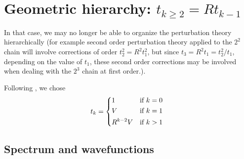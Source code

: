 \documentclass[11pt]{article}
\begin{document}
\section{Geometric hierarchy: $t_{k\geq2} = R t_{k-1}$}
In that case, we may no longer be able to organize the perturbation theory hierarchically (for example second order perturbation theory applied to the $2^2$ chain will involve corrections of order $t_2^2 = R^2 t_1^2$, but since $t_3 = R^2 t_1 = t_2^2/t_1$, depending on the value of $t_1$, these second order corrections may be involved when dealing with the $2^{3}$ chain at first order.).

Following \cite{transitionmatrix}, we chose
\begin{equation}
t_k = \begin{dcases*}
        1  & if $k=0$ \\
        V & if $k=1$\\
        R^{k-2} V & if $k > 1$
        \end{dcases*}
\end{equation}

\subsection{Spectrum and wavefunctions}
\end{document}
